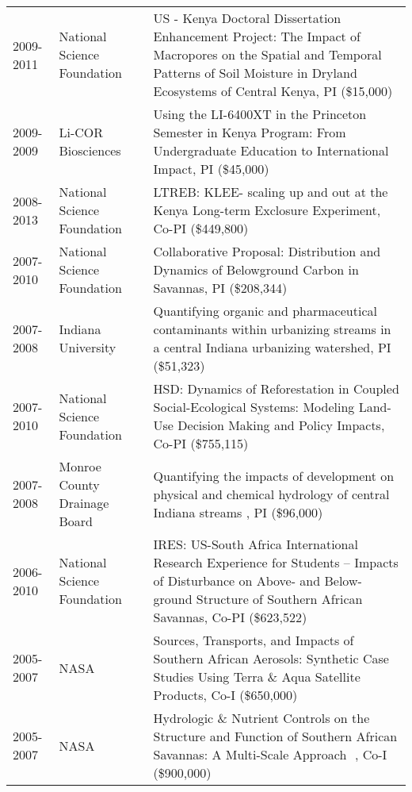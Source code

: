 \begin{longtable}{p{1.75cm}>{\raggedright}p{}p{6cm}}
2009-2011 & National Science Foundation & US - Kenya Doctoral Dissertation Enhancement Project: The Impact of Macropores on the Spatial and Temporal Patterns of Soil Moisture in Dryland Ecosystems of Central Kenya, PI (\$15,000) \\ 
2009-2009 & Li-COR Biosciences & Using the LI-6400XT in the Princeton Semester in Kenya Program: From Undergraduate Education to International Impact, PI (\$45,000) \\ 
2008-2013 & National Science Foundation & LTREB: KLEE- scaling up and out at the Kenya Long-term Exclosure Experiment, Co-PI (\$449,800) \\ 
2007-2010 & National Science Foundation & Collaborative Proposal: Distribution and Dynamics of Belowground Carbon in Savannas, PI (\$208,344) \\ 
2007-2008 & Indiana University & Quantifying organic and pharmaceutical contaminants within urbanizing streams in a central Indiana urbanizing watershed, PI (\$51,323) \\ 
2007-2010 & National Science Foundation & HSD: Dynamics of Reforestation in Coupled Social-Ecological Systems: Modeling Land-Use Decision Making and Policy Impacts, Co-PI (\$755,115) \\ 
2007-2008 & Monroe County Drainage Board & Quantifying the impacts of development on physical and chemical hydrology of central Indiana streams , PI (\$96,000) \\ 
2006-2010 & National Science Foundation & IRES: US-South Africa International Research Experience for Students -- Impacts of Disturbance on Above- and Below-ground Structure of Southern African Savannas, Co-PI (\$623,522) \\ 
2005-2007 & NASA & Sources, Transports, and Impacts of Southern African Aerosols: Synthetic Case Studies Using Terra \& Aqua Satellite Products, Co-I (\$650,000) \\ 
2005-2007 & NASA & Hydrologic \& Nutrient Controls on the Structure and Function of Southern African Savannas: A Multi-Scale Approach 
, Co-I (\$900,000) \\ 

\end{longtable}

